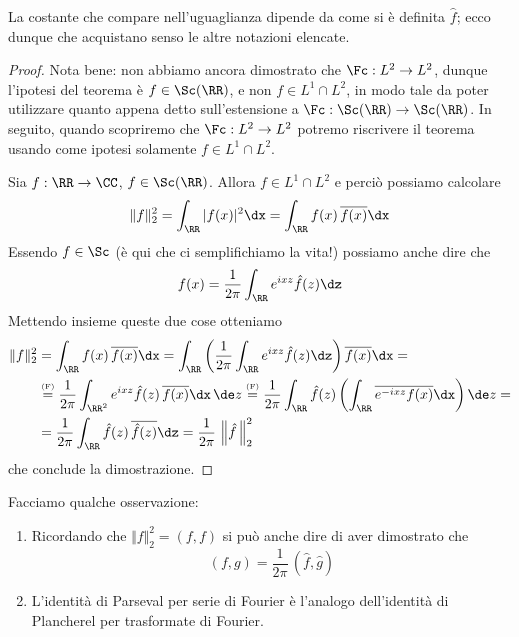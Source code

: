 \begin{rem}
La costante che compare nell'uguaglianza dipende da come si è definita $\hat{f}$; ecco dunque che acquistano senso le altre notazioni elencate.
\end{rem}

\begin{proof} 
Nota bene: non abbiamo ancora dimostrato che $\Fc: L^2\to L^2$, dunque l'ipotesi del teorema è $f\in\Sc(\RR)$, e non $f\in L^1\cap L^2$, in modo tale da poter utilizzare quanto appena detto sull'estensione a $\Fc : \Sc(\RR)\rightarrow \Sc(\RR)$. In seguito, quando scopriremo che $\Fc: L^2\to L^2$ potremo riscrivere il teorema usando come ipotesi solamente $f\in L^1\cap L^2$.

Sia $f:\RR\to\CC$, $f\in\Sc(\RR)$. Allora $f\in L^1\cap L^2$ e perciò possiamo calcolare
\begin{equation*}
\Vert f \Vert_2^2=\int_\RR |f(x)|^{2} \dx = \int_\RR f(x)\,\overline{f(x)}\dx
\end{equation*}
Essendo $f\in\Sc$ (è qui che ci semplifichiamo la vita!) possiamo anche dire che
\begin{equation*}
f(x)=\frac{1}{2\pi}\int_\RR e^{ixz}\hat{f}(z) \dz
\end{equation*}
Mettendo insieme queste due cose otteniamo
\begin{align*}
\Vert f \Vert_2^2&=\int_\RR f(x)\,\overline{f(x)}\dx=\int_\RR \left(\frac{1}{2\pi}\int_\RR e^{ixz}\hat{f}(z) \dz\right)\overline{f(x)}\dx =\\
&\overset{\underset{\mathrm{(F)}}{}}{=}\frac{1}{2\pi}\int_{\RR^2}e^{ixz}\hat{f}(z)\,\overline{f(x)}\dx\,\de z\overset{\underset{\mathrm{(F)}}{}}{=}\frac{1}{2\pi}\int_\RR \hat{f}(z) \left(\int_\RR \overline{e^{-ixz}f(x)} \dx\right)\de z=\\
&=\frac{1}{2\pi}\int_\RR \hat{f}(z)\,\overline{\hat{f}(z)}\dz=\frac{1}{2\pi}\,\left\|\hat{f}\,\right\|_2^2
\end{align*}
che conclude la dimostrazione.
\end{proof}

Facciamo qualche osservazione:
\begin{enumerate}
    \item Ricordando che $\Vert f\Vert_2^2=(f,f)$ si può anche dire di aver dimostrato che
    \begin{equation*}
    (f,g)=\frac{1}{2\pi}\,\left(\hat{f},\hat{g}\right)
    \end{equation*}

    \item L'identità di Parseval per serie di Fourier è l'analogo dell'identità di Plancherel per trasformate di Fourier.
\end{enumerate}


